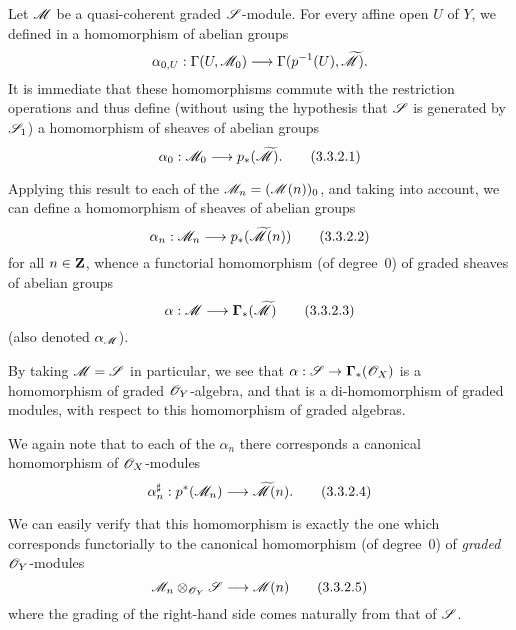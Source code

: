 \begin{env}[3.3.2]
\label{II.3.3.2}
Let $\mathscr{M}$ be a quasi-coherent graded $\mathscr{S}$-module.
For every affine open $U$ of $Y$, we defined in  a homomorphism of abelian groups
\[
  \alpha_{0,U} : \Gamma(U,\sh{M}_0) \to \Gamma(p^{-1}(U),\widetilde{\sh{M}}).
\]
It is immediate that these homomorphisms commute with the restriction operations  and thus define (without using the hypothesis that $\mathscr{S}$ is generated by $\mathscr{S}_1$) a homomorphism of sheaves of abelian groups
\[
\label{II.3.3.2.1}
  \alpha_0 : \sh{M}_0 \to p_*(\widetilde{\sh{M}}).
\tag{3.3.2.1}
\]

Applying this result to each of the $\mathscr{M}_n=(\mathscr{M}(n))_0$, and taking  into account, we can define a homomorphism of sheaves of abelian groups
\[
\label{II.3.3.2.2}
  \alpha_n : \sh{M}_n \to p_*(\widetilde{\sh{M}}(n))
\tag{3.3.2.2}
\]
for all $n\in\mathbf{Z}$, whence a functorial homomorphism (of degree~$0$) of graded sheaves of abelian groups
\[
\label{II.3.3.2.3}
  \alpha : \sh{M} \to \bbGamma_*(\widetilde{\sh{M}})
\tag{3.3.2.3}
\]
(also denoted $\alpha_{\mathscr{M}}$).

By taking $\mathscr{M}=\mathscr{S}$ in particular, we see that $\alpha:\sh{S}\to\bbGamma_*(\sh{O}_X)$ is a homomorphism of graded $\mathscr{O}_Y$-algebra, and that  is a di-homomorphism of graded modules, with respect to this homomorphism of graded algebras.

We again note that to each of the $\alpha_n$ there corresponds  a canonical homomorphism of $\mathscr{O}_X$-modules
\[
\label{II.3.3.2.4}
  \alpha_n^\sharp : p^*(\sh{M}_n) \to \widetilde{\sh{M}}(n).
\tag{3.3.2.4}
\]

We can easily verify that this homomorphism is exactly the one which corresponds functorially  to the canonical homomorphism (of degree~$0$) of \emph{graded} $\mathscr{O}_Y$-modules
\[
\label{II.3.3.2.5}
  \sh{M}_n\otimes_{\sh{O}_Y}\sh{S} \to \sh{M}(n)
\tag{3.3.2.5}
\]
where the grading of the right-hand side comes naturally from that of $\mathscr{S}$.
\end{env}











